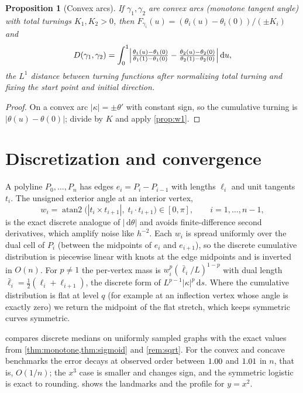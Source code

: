 \documentclass[11pt]{amsart}
\newtheorem{proposition}[theorem]{Proposition}
\theoremstyle{definition}
\theoremstyle{remark}
\newcommand{\dd}{\,\mathrm{d}}
\begin{document}
\begin{proposition}[Convex arcs]\label{prop:arkin}
If $\gamma_1,\gamma_2$ are convex arcs (monotone tangent angle) with total turnings $K_1,K_2>0$, then $F_{\gamma_i}(u)=(\theta_i(u)-\theta_i(0))/(\pm K_i)$ and
\[
D(\gamma_1,\gamma_2)=\int_0^1\Bigl|\tfrac{\theta_1(u)-\theta_1(0)}{\theta_1(1)-\theta_1(0)}-\tfrac{\theta_2(u)-\theta_2(0)}{\theta_2(1)-\theta_2(0)}\Bigr|\dd u ,
\]
the $L^1$ distance between turning functions \cite{arkin1991metric} after normalizing total turning and fixing the start point and initial direction.
\end{proposition}

\begin{proof}
On a convex arc $|\kappa|=\pm\theta'$ with constant sign, so the cumulative turning is $|\theta(u)-\theta(0)|$; divide by $K$ and apply \cref{prop:w1}.
\end{proof}

\section{Discretization and convergence}\label{sec:discrete}

A polyline $P_0,\dots,P_n$ has edges $e_i=P_i-P_{i-1}$ with lengths $\ell_i$ and unit tangents $t_i$. The unsigned exterior angle at an interior vertex,
\[
w_i=\operatorname{atan2}\bigl(|t_i\times t_{i+1}|,\;t_i\cdot t_{i+1}\bigr)\in[0,\pi],\qquad i=1,\dots,n-1,
\]
is the exact discrete analogue of $|\dd\theta|$ and avoids finite-difference second derivatives, which amplify noise like $h^{-2}$. Each $w_i$ is spread uniformly over the dual cell of $P_i$ (between the midpoints of $e_i$ and $e_{i+1}$), so the discrete cumulative distribution is piecewise linear with knots at the edge midpoints and is inverted in $O(n)$. For $p\ne1$ the per-vertex mass is $w_i^{p}(\bar\ell_i/L)^{1-p}$ with dual length $\bar\ell_i=\tfrac12(\ell_i+\ell_{i+1})$, the discrete form of $L^{p-1}|\kappa|^p\dd s$. Where the cumulative distribution is flat at level $q$ (for example at an inflection vertex whose angle is exactly zero) we return the midpoint of the flat stretch, which keeps symmetric curves symmetric.

 compares discrete medians on uniformly sampled graphs with the exact values from \cref{thm:monotone,thm:sigmoid} and \cref{rem:sqrt}. For the convex and concave benchmarks the error decays at observed order between $1.00$ and $1.01$ in $n$, that is, $O(1/n)$; the $x^3$ case is smaller and changes sign, and the symmetric logistic is exact to rounding.  shows the landmarks and the profile for $y=x^2$.
\end{document}
